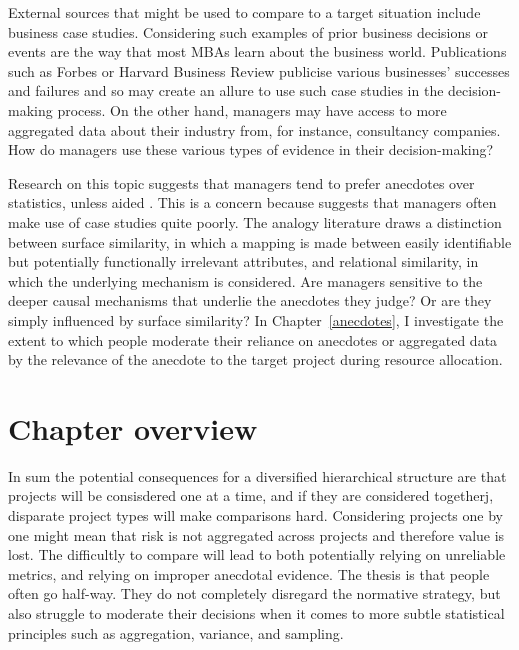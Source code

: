 \documentclass[a4paper, nobind, dvipsnames]{templates/ociamthesis}
\theoremstyle{definition}
\theoremstyle{definition}
\theoremstyle{definition}
\theoremstyle{definition}
\theoremstyle{remark}
\begin{document}
External sources that might be used to compare to a target situation include
business case studies. Considering such examples of prior business decisions or
events are the way that most MBAs learn about the business world. Publications
such as Forbes or Harvard Business Review publicise various businesses'
successes and failures and so may create an allure to use such case studies in
the decision-making process. On the other hand, managers may have access to more
aggregated data about their industry from, for instance, consultancy companies.
How do managers use these various types of evidence in their decision-making?

Research on this topic suggests that managers tend to prefer anecdotes over
statistics, unless aided \autocite{wainberg2018}. This is a concern because \textcite{gavetti2005}
suggests that managers often make use of case studies quite poorly. The analogy
literature draws a distinction between surface similarity, in which a mapping is
made between easily identifiable but potentially functionally irrelevant
attributes, and relational similarity, in which the underlying mechanism is
considered. Are managers sensitive to the deeper causal mechanisms that underlie
the anecdotes they judge? Or are they simply influenced by surface similarity?
In Chapter~\ref{anecdotes}, I investigate the extent to which people moderate
their reliance on anecdotes or aggregated data by the relevance of the anecdote
to the target project during resource allocation.

\section{Chapter overview}

In sum the potential consequences for a diversified hierarchical structure are
that projects will be consisdered one at a time, and if they are considered
togetherj, disparate project types will make comparisons hard. Considering
projects one by one might mean that risk is not aggregated across projects and
therefore value is lost. The difficultly to compare will lead to both
potentially relying on unreliable metrics, and relying on improper anecdotal
evidence. The thesis is that people often go half-way. They do not completely
disregard the normative strategy, but also struggle to moderate their decisions
when it comes to more subtle statistical principles such as aggregation,
variance, and sampling.
\end{document}
